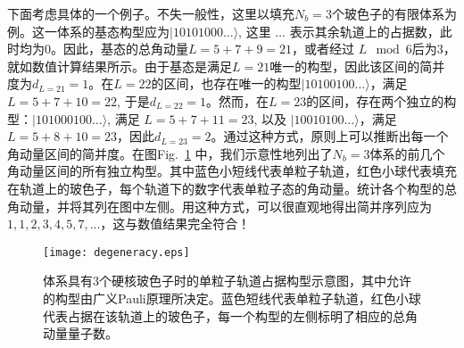 下面考虑具体的一个例子。不失一般性，这里以填充$N_b = 3$个玻色子的有限体系为例。这一体系的基态构型应为$|10101000 \ldots \rangle$, 这里 $\ldots$ 表示其余轨道上的占据数，此时均为0。因此，基态的总角动量$L = 5 + 7 + 9 = 21$，或者经过 $L \mod 6$后为3，就如数值计算结果所示。由于基态是满足$L=21$唯一的构型，因此该区间的简并度为$d_{L=21}=1$。在$L=22$的区间，也存在唯一的构型$|10100100 \ldots \rangle$，满足$L=5+7+10 =
22$, 于是$d_{L=22}=1$。然而，在$L=23$的区间，存在两个独立的构型：$|101000100 \ldots \rangle$, 满足 $L=5+7+11 = 23$, 以及 $|10010100 \ldots \rangle$，满足$L=5+8+10 = 23$，因此$d_{L=23}=2$。通过这种方式，原则上可以推断出每一个角动量区间的简并度。在图Fig.~\ref{fig:degeneracycount} 中，我们示意性地列出了$N_b=3$体系的前几个角动量区间的所有独立构型。其中蓝色小短线代表单粒子轨道，红色小球代表填充在轨道上的玻色子，每个轨道下的数字代表单粒子态的角动量。统计各个构型的总角动量，并将其列在图中左侧。用这种方式，可以很直观地得出简并序列应为$1,1,2,3,4,5,7, ...$，这与数值结果完全符合！

\begin{figure}[!htb]
    \centering
    \texttt{[image: degeneracy.eps]}
    \caption{体系具有3个硬核玻色子时的单粒子轨道占据构型示意图，其中允许的构型由广义Pauli原理所决定。蓝色短线代表单粒子轨道，红色小球代表占据在该轨道上的玻色子，每一个构型的左侧标明了相应的总角动量量子数。}
\label{fig:degeneracycount}
\end{figure}

